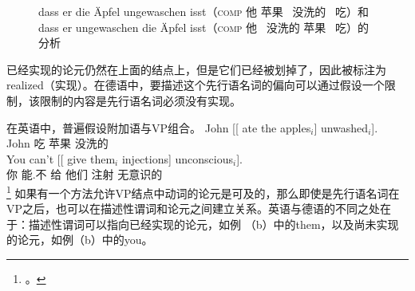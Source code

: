 \begin{figure}
\caption{dass er die Äpfel ungewaschen isst（\textsc{comp} 他  苹果 \, 没洗的 \, 吃）和dass er ungewaschen die Äpfel isst（\textsc{comp} 他 \, 没洗的  苹果 \, 吃）的分析}\label{anal-er-die-frau-nackt-sieht}
\end{figure}%
已经实现的论元仍然在上面的结点上，但是它们已经被划掉了，因此被标注为realized（实现）。在德语中，要描述这个先行语名词的偏向可以通过假设一个限制，该限制的内容是先行语名词必须没有实现。

在英语中，普遍假设附加语与VP组合。
\eal
\ex 
\gll John [[ ate the apples$_i$] unwashed$_i$].\\
	John {} 吃  苹果 没洗的\\
\ex 
\gll You can't [[ give them$_i$ injections] unconscious$_i$].\\
	你 能.不 {} 给 他们 注射 无意识的\\
\footnote{%
 。
}
\zl
如果有一个方法允许VP结点中动词的论元是可及的，那么即使是先行语名词在VP之后，也可以在描述性谓词和论元之间建立关系。英语与德语的不同之处在于：描述性谓词可以指向已经实现的论元，如例 （b）中的them，以及尚未实现的论元，如例（b）中的you。

